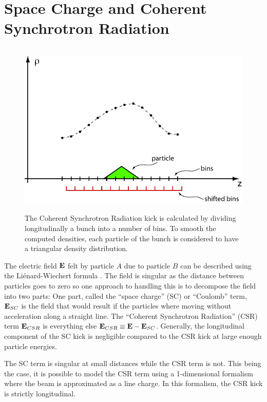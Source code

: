 \section{Space Charge and Coherent Synchrotron Radiation}
\label{s:csr}   

\begin{figure}[!b]
\centering \includegraphics[height=8.4cm]{csr-bin.pdf} \caption[CSR Calculation] {The Coherent
Synchrotron Radiation kick is calculated by dividing longitudinally a bunch into a number of
bins. To smooth the computed densities, each particle of the bunch is considered to have a
triangular density distribution.}  \label{f:csr.bin}
\end{figure}

The electric field ${\bf E}$ felt by particle $A$ due to particle $B$ can be described using the
Li\'{e}nard-Wiechert formula \cite{b:csr}. The field is singular as the distance between particles
goes to zero so one approach to handling this is to decompose the field into two parts: One part,
called the ``space charge'' (SC) or ``Coulomb'' term, ${\bf E}_{SC}$ is the field that would result if
the particles where moving without acceleration along a straight line. The ``Coherent Synchrotron
Radiation'' (CSR) term ${\bf E}_{CSR}$ is everything else ${\bf E}_{CSR} \equiv {\bf E} - {\bf E}_{SC}$.
Generally, the longitudinal component of the SC kick is negligible compared to the CSR kick at large
enough particle energies.

The SC term is singular at small distances while the CSR term is not. This being the case, it is
possible to model the CSR term using a 1-dimensional formalism where the beam is approximated as a
line charge\cite{b:csr,b:csr2}. In this formalism, the CSR kick is strictly longitudinal.

